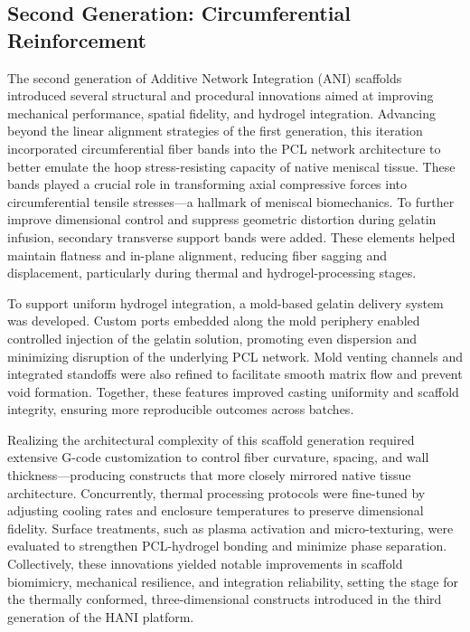 \subsection{Second Generation: Circumferential Reinforcement}

The second generation of Additive Network Integration (ANI) scaffolds introduced several structural and procedural innovations aimed at improving mechanical performance, spatial fidelity, and hydrogel integration. Advancing beyond the linear alignment strategies of the first generation, this iteration incorporated circumferential fiber bands into the PCL network architecture to better emulate the hoop stress-resisting capacity of native meniscal tissue. These bands played a crucial role in transforming axial compressive forces into circumferential tensile stresses—a hallmark of meniscal biomechanics. To further improve dimensional control and suppress geometric distortion during gelatin infusion, secondary transverse support bands were added. These elements helped maintain flatness and in-plane alignment, reducing fiber sagging and displacement, particularly during thermal and hydrogel-processing stages.

To support uniform hydrogel integration, a mold-based gelatin delivery system was developed. Custom ports embedded along the mold periphery enabled controlled injection of the gelatin solution, promoting even dispersion and minimizing disruption of the underlying PCL network. Mold venting channels and integrated standoffs were also refined to facilitate smooth matrix flow and prevent void formation. Together, these features improved casting uniformity and scaffold integrity, ensuring more reproducible outcomes across batches.

Realizing the architectural complexity of this scaffold generation required extensive G-code customization to control fiber curvature, spacing, and wall thickness—producing constructs that more closely mirrored native tissue architecture. Concurrently, thermal processing protocols were fine-tuned by adjusting cooling rates and enclosure temperatures to preserve dimensional fidelity. Surface treatments, such as plasma activation and micro-texturing, were evaluated to strengthen PCL-hydrogel bonding and minimize phase separation. Collectively, these innovations yielded notable improvements in scaffold biomimicry, mechanical resilience, and integration reliability, setting the stage for the thermally conformed, three-dimensional constructs introduced in the third generation of the HANI platform.
 

